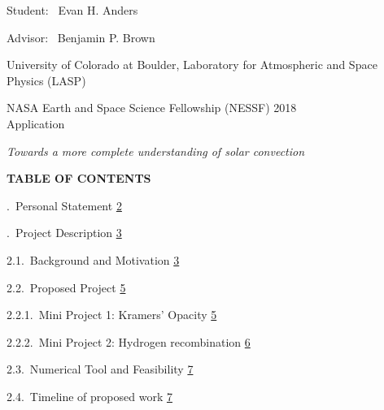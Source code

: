 \documentclass[12pt]{article}
\begin{document}
\begin{center}

\vspace*{0.07in}
Student: \, Evan H. Anders\hspace{0.6cm}

Advisor: \, Benjamin P. Brown

\vspace*{0.15in}
University of Colorado at Boulder, Laboratory for Atmospheric and Space Physics (LASP)

\vspace*{0.15in}
NASA Earth and Space Science Fellowship (NESSF) 2018 \\
Application

\vspace*{0.39in}
{\em Towards a more complete understanding of solar convection}

\vspace*{0.44in}
{\bf TABLE OF CONTENTS}
\end{center}

\vspace*{0.33in}
.$\,$ Personal Statement
\dotfill \hyperlink{page.2}{2}

\vspace*{0.06in}
.$\,$ Project Description
\dotfill \hyperlink{page.3}{3}

\vspace*{0.06in}
\noindent\hspace*{0.25in}
2.1.$\,$ Background and Motivation
\dotfill \hyperlink{page.3}{3}

\vspace*{0.06in}
\noindent\hspace*{0.25in}
2.2.$\,$ Proposed Project
\dotfill \hyperlink{page.5}{5}

\vspace*{0.06in}
\noindent\hspace*{0.50in}
2.2.1.$\,$ Mini Project 1: Kramers' Opacity
\dotfill \hyperlink{page.5}{5}

\vspace*{0.06in}
\noindent\hspace*{0.50in}
2.2.2.$\,$ Mini Project 2: Hydrogen recombination
\dotfill \hyperlink{page.6}{6}

\vspace*{0.06in}
\noindent\hspace*{0.25in}
2.3.$\,$ Numerical Tool and Feasibility
\dotfill \hyperlink{page.7}{7}

\vspace*{0.06in}
\noindent\hspace*{0.25in}
2.4.$\,$ Timeline of proposed work
\dotfill \hyperlink{page.7}{7}
\end{document}
